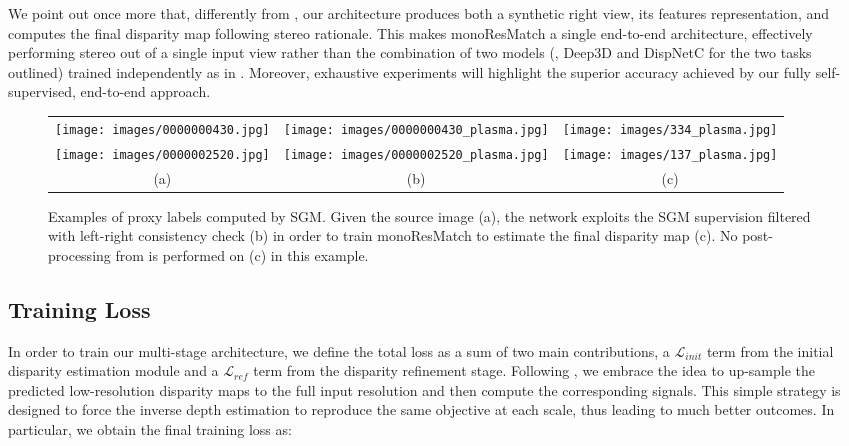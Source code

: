 \documentclass[10pt,twocolumn,letterpaper]{article}
\begin{document}
We point out once more that, differently from \cite{luo2018single}, our architecture produces both a synthetic right view, \ie its features representation, and computes the final disparity map following stereo rationale. This makes monoResMatch a single end-to-end architecture, effectively performing stereo out of a single input view rather than the combination of two models (\ie, Deep3D \cite{xie2016deep3d} and DispNetC \cite{Mayer_2016_CVPR} for the two tasks outlined) trained independently as in \cite{luo2018supervised}. Moreover, exhaustive experiments will highlight the superior accuracy achieved by our fully self-supervised, end-to-end approach. 


\begin{figure*}
    \centering
    \renewcommand{\tabcolsep}{1pt}   
    \begin{tabular}{ccc}

        \texttt{[image: images/0000000430.jpg]}  &
        \texttt{[image: images/0000000430\_plasma.jpg]}  &
        \texttt{[image: images/334\_plasma.jpg]} 
        \\
        \texttt{[image: images/0000002520.jpg]}  &
        
        \texttt{[image: images/0000002520\_plasma.jpg]} &
        \texttt{[image: images/137\_plasma.jpg]}  
        \\
        (a) & (b) & (c)\\
    \end{tabular}
    \caption{Examples of proxy labels computed by SGM. Given the source image (a), the network exploits the SGM supervision filtered with left-right consistency check (b) in order to train monoResMatch to estimate the final disparity map (c). No post-processing from \cite{monodepth17} is performed on (c) in this example.}
    \label{fig:distillation}
\end{figure*}
 



\subsection{Training Loss}

In order to train our multi-stage architecture, we define the total loss as a sum of two main contributions, a $\mathcal{L}_{init}$ term from the initial disparity estimation module and a $\mathcal{L}_{ref}$ term from the disparity refinement stage. Following \cite{godard2018digging}, we embrace the idea to up-sample the predicted low-resolution disparity maps to the full input resolution and then compute the corresponding signals. This simple strategy is designed to force the inverse depth estimation to reproduce the same objective at each scale, thus leading to much better outcomes. In particular, we obtain the final training loss as:
\end{document}
